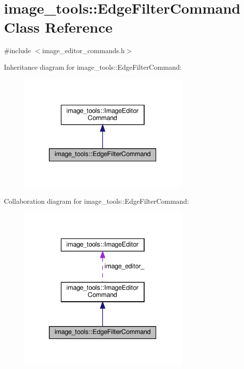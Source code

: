 \hypertarget{classimage__tools_1_1EdgeFilterCommand}{}\section{image\+\_\+tools\+:\+:Edge\+Filter\+Command Class Reference}
\label{classimage__tools_1_1EdgeFilterCommand}


{\ttfamily \#include $<$image\+\_\+editor\+\_\+commands.\+h$>$}



Inheritance diagram for image\+\_\+tools\+:\+:Edge\+Filter\+Command\+:
\nopagebreak
\begin{figure}[H]
\begin{center}
\leavevmode
\includegraphics[width=244pt]{classimage__tools_1_1EdgeFilterCommand__inherit__graph}
\end{center}
\end{figure}


Collaboration diagram for image\+\_\+tools\+:\+:Edge\+Filter\+Command\+:
\nopagebreak
\begin{figure}[H]
\begin{center}
\leavevmode
\includegraphics[width=244pt]{classimage__tools_1_1EdgeFilterCommand__coll__graph}
\end{center}
\end{figure}
